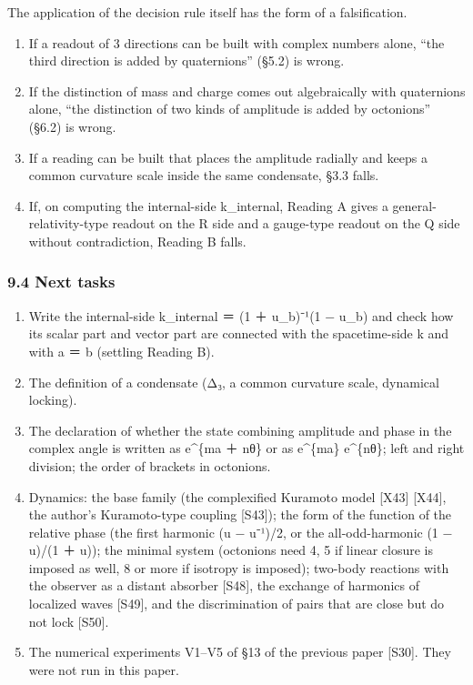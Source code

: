 \documentclass[
  a4paper,
]{article}
\providecommand{\tightlist}{%
  \setlength{\itemsep}{0pt}\setlength{\parskip}{0pt}}
\begin{document}
The application of the decision rule itself has the form of a
falsification.

\begin{enumerate}
\def\labelenumi{\arabic{enumi}.}
\tightlist
\item
  If a readout of 3 directions can be built with complex numbers alone,
  ``the third direction is added by quaternions'' (§5.2) is wrong.
\item
  If the distinction of mass and charge comes out algebraically with
  quaternions alone, ``the distinction of two kinds of amplitude is
  added by octonions'' (§6.2) is wrong.
\item
  If a reading can be built that places the amplitude radially and keeps
  a common curvature scale inside the same condensate, §3.3 falls.
\item
  If, on computing the internal-side k\_internal, Reading A gives a
  general-relativity-type readout on the R side and a gauge-type readout
  on the Q side without contradiction, Reading B falls.
\end{enumerate}

\subsubsection{9.4 Next tasks}\label{next-tasks}

\begin{enumerate}
\def\labelenumi{\arabic{enumi}.}
\tightlist
\item
  Write the internal-side k\_internal ＝ (1 ＋ u\_b)⁻¹(1 − u\_b) and
  check how its scalar part and vector part are connected with the
  spacetime-side k and with \textbar a\textbar{} ＝ \textbar b\textbar{}
  (settling Reading B).
\item
  The definition of a condensate (Δ₃, a common curvature scale,
  dynamical locking).
\item
  The declaration of whether the state combining amplitude and phase in
  the complex angle is written as e\^{}\{ma ＋ nθ\} or as e\^{}\{ma\}
  e\^{}\{nθ\}; left and right division; the order of brackets in
  octonions.
\item
  Dynamics: the base family (the complexified Kuramoto model {[}X43{]}
  {[}X44{]}, the author's Kuramoto-type coupling {[}S43{]}); the form of
  the function of the relative phase (the first harmonic (u − u⁻¹)/2, or
  the all-odd-harmonic (1 − u)/(1 ＋ u)); the minimal system (octonions
  need 4, 5 if linear closure is imposed as well, 8 or more if isotropy
  is imposed); two-body reactions with the observer as a distant
  absorber {[}S48{]}, the exchange of harmonics of localized waves
  {[}S49{]}, and the discrimination of pairs that are close but do not
  lock {[}S50{]}.
\item
  The numerical experiments V1--V5 of §13 of the previous paper
  {[}S30{]}. They were not run in this paper.
\end{enumerate}
\end{document}
